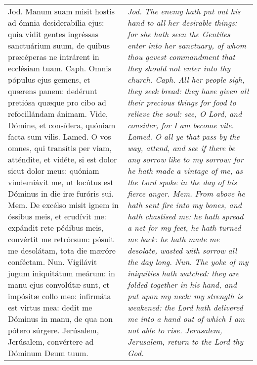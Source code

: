 \begin{tabular}{p{8cm} | p{8cm}}
Jod. Manum suam misit hostis ad ómnia desiderabília ejus: quia vidit gentes ingréssas sanctuárium suum, de quibus præcéperas ne intrárent in ecclésiam tuam.
Caph. Omnis pópulus ejus gemens, et quærens panem: dedérunt pretiósa quæque pro cibo ad refocillándam ánimam. Vide, Dómine, et consídera, quóniam facta sum vilis.
Lamed. O vos omnes, qui transítis per viam, atténdite, et vidéte, si est dolor sicut dolor meus: quóniam vindemiávit me, ut locútus est Dóminus in die iræ furóris sui.
Mem. De excélso misit ignem in óssibus meis, et erudívit me: expándit rete pédibus meis, convértit me retrórsum: pósuit me desolátam, tota die mæróre conféctam.
Nun. Vigilávit jugum iniquitátum meárum: in manu ejus convolútæ sunt, et impósitæ collo meo: infirmáta est virtus mea: dedit me Dóminus in manu, de qua non pótero súrgere.
Jerúsalem, Jerúsalem, convértere ad Dóminum Deum tuum.
& \textit{Jod. The enemy hath put out his hand to all her desirable things: for she hath seen the Gentiles enter into her sanctuary, of whom thou gavest commandment that they should not enter into thy church.
Caph. All her people sigh, they seek bread: they have given all their precious things for food to relieve the soul: see, O Lord, and consider, for I am become vile.
Lamed. O all ye that pass by the way, attend, and see if there be any sorrow like to my sorrow: for he hath made a vintage of me, as the Lord spoke in the day of his fierce anger.
Mem. From above he hath sent fire into my bones, and hath chastised me: he hath spread a net for my feet, he hath turned me back: he hath made me desolate, wasted with sorrow all the day long.
Nun. The yoke of my iniquities hath watched: they are folded together in his hand, and put upon my neck: my strength is weakened: the Lord hath delivered me into a hand out of which I am not able to rise.
Jerusalem, Jerusalem, return to the Lord thy God.
}
\end{tabular}